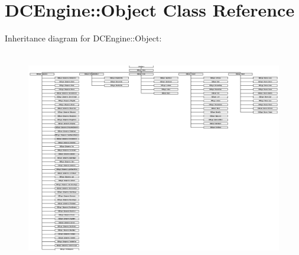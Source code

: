 \hypertarget{classDCEngine_1_1Object}{\section{D\-C\-Engine\-:\-:Object Class Reference}
\label{classDCEngine_1_1Object}
}
Inheritance diagram for D\-C\-Engine\-:\-:Object\-:\begin{figure}[H]
\begin{center}
\leavevmode
\includegraphics[height=9.429553cm]{classDCEngine_1_1Object}
\end{center}
\end{figure}
